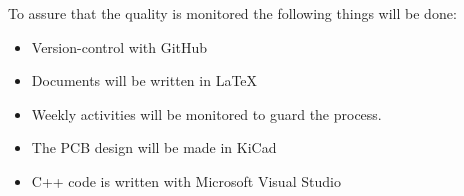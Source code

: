 To assure that the quality is monitored the following things will be done:
\begin{itemize}
	\setlength\itemsep{-0.3em}
    \item Version-control with GitHub
    \item Documents will be written in LaTeX
    \item Weekly activities will be monitored to guard the process.
    \item The PCB design will be made in KiCad
    \item C++ code is written with Microsoft Visual Studio
\end{itemize}